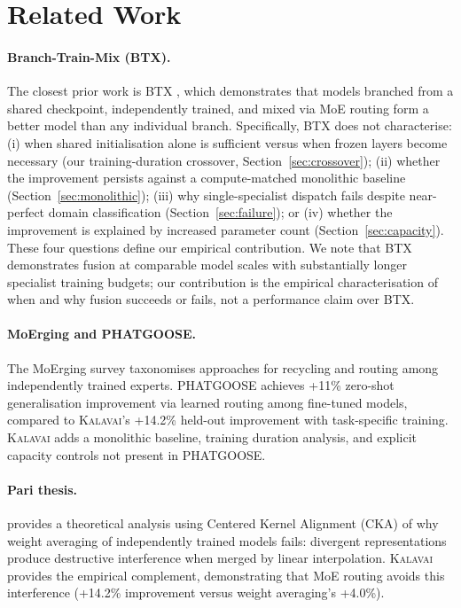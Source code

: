 \documentclass{article}
\newcommand{\kalavai}{\textsc{Kalavai}\xspace}
\begin{document}
\section{Related Work}
\label{sec:related}

\paragraph{Branch-Train-Mix (BTX).} The closest prior work is BTX \citep{sukhbaatar2024branchtrainmix}, which demonstrates that models branched from a shared checkpoint, independently trained, and mixed via MoE routing form a better model than any individual branch. Specifically, BTX does not characterise: (i) when shared initialisation alone is sufficient versus when frozen layers become necessary (our training-duration crossover, Section~\ref{sec:crossover}); (ii) whether the improvement persists against a compute-matched monolithic baseline (Section~\ref{sec:monolithic}); (iii) why single-specialist dispatch fails despite near-perfect domain classification (Section~\ref{sec:failure}); or (iv) whether the improvement is explained by increased parameter count (Section~\ref{sec:capacity}). These four questions define our empirical contribution. We note that BTX demonstrates fusion at comparable model scales with substantially longer specialist training budgets; our contribution is the empirical characterisation of when and why fusion succeeds or fails, not a performance claim over BTX.

\paragraph{MoErging and PHATGOOSE.} The MoErging survey \citep{yadav2024merging} taxonomises approaches for recycling and routing among independently trained experts. PHATGOOSE \citep{muqeeth2024phatgoose} achieves +11\% zero-shot generalisation improvement via learned routing among fine-tuned models, compared to \kalavai's +14.2\% held-out improvement with task-specific training. \kalavai adds a monolithic baseline, training duration analysis, and explicit capacity controls not present in PHATGOOSE.

\paragraph{Pari thesis.} \citet{pari2025merging} provides a theoretical analysis using Centered Kernel Alignment (CKA) of why weight averaging of independently trained models fails: divergent representations produce destructive interference when merged by linear interpolation. \kalavai provides the empirical complement, demonstrating that MoE routing avoids this interference (+14.2\% improvement versus weight averaging's +4.0\%).
\end{document}

